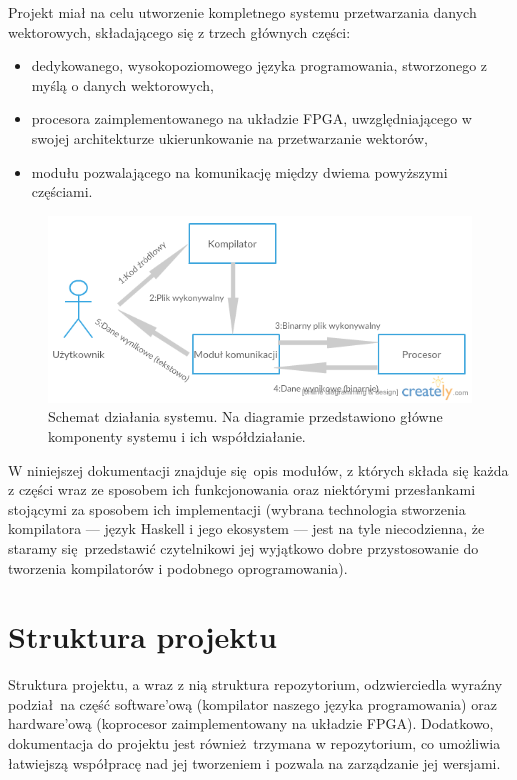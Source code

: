 Projekt miał na celu utworzenie kompletnego systemu przetwarzania danych wektorowych, składającego się z trzech głównych części:

\begin{itemize}
  \item dedykowanego, wysokopoziomowego języka programowania, stworzonego z myślą o danych wektorowych,
  \item procesora zaimplementowanego na układzie FPGA, uwzględniającego w swojej architekturze ukierunkowanie na przetwarzanie wektorów,
  \item modułu pozwalającego na komunikację między dwiema powyższymi częściami.
\end{itemize}

\begin{figure}
  \begin{center}
    \includegraphics[scale=0.5]{images/SystemOverview.png}
    \caption{Schemat działania systemu. Na diagramie przedstawiono główne komponenty systemu i ich współdziałanie.}
    \label{fig:file-structure}
  \end{center}
\end{figure}

W niniejszej dokumentacji znajduje się opis modułów, z których składa się każda z części wraz ze sposobem ich funkcjonowania oraz niektórymi przesłankami stojącymi za sposobem ich implementacji (wybrana technologia stworzenia kompilatora --- język Haskell i jego ekosystem --- jest na tyle niecodzienna, że staramy się przedstawić czytelnikowi jej wyjątkowo dobre przystosowanie do tworzenia kompilatorów i podobnego oprogramowania).

\section{Struktura projektu}

Struktura projektu, a wraz z nią struktura repozytorium, odzwierciedla wyraźny podział na część software'ową (kompilator naszego języka programowania) oraz hardware'ową (koprocesor zaimplementowany na układzie FPGA). Dodatkowo, dokumentacja do projektu jest również trzymana w repozytorium, co umożliwia łatwiejszą współpracę nad jej tworzeniem i pozwala na zarządzanie jej wersjami.

